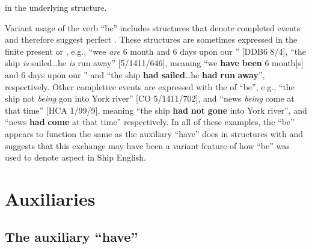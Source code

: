 in the underlying structure. 

Variant usage of the verb “be” includes structures that denote completed events and therefore suggest perfect . These structures are sometimes expressed in the finite present or , e.g., “wee \textit{are} 6 month and 6 days upon our ” [DDB6 8/4], “the ship \textit{is} sailed…he \textit{is} run away” [5/1411/646], meaning “we \textbf{have} \textbf{been} 6 month[s] and 6 days upon our ” and “the ship \textbf{had }\textbf{sailed}…he \textbf{had} \textbf{run} \textbf{away}”, respectively. Other completive events are expressed with the  of “be”, e.g., “the  ship not \textit{being} gon into York river” [CO 5/1411/702], and “news \textit{being} come at that time” [HCA 1/99/9], meaning “the  ship \textbf{had} \textbf{not} \textbf{gone} into York river”, and “news \textbf{had} \textbf{come} at that time” respectively. In all of these examples, the  “be” appears to function the same as the auxiliary “have” does in structures with  and suggests that this exchange may have been a variant feature of how “be” was used to denote aspect in Ship English. 

\section{{Auxiliaries}}\label{sec:6.4}

\subsection{{The auxiliary “have”}}\label{sec:6.4.1}


